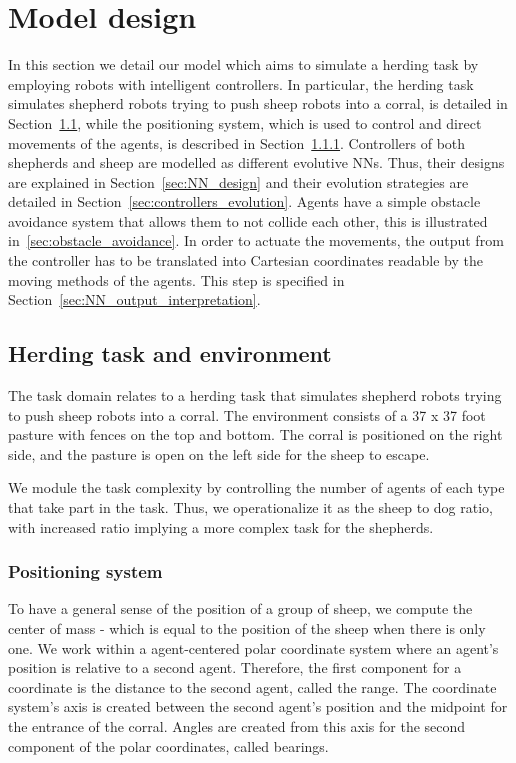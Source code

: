 \documentclass[conference]{IEEEtran}
\begin{document}
\section{Model design}
In this section we detail our model which aims to simulate a herding task by employing robots with intelligent controllers.
In particular, the herding task simulates shepherd robots trying to push sheep robots into a corral, is detailed in Section~\ref{sec:herding_task_environment},
while the positioning system, which is used to control and direct movements of the agents, is described in Section~\ref{sec:positioning_system}. 
Controllers of both shepherds and sheep are modelled as different evolutive NNs.
Thus, their designs are explained in Section~\ref{sec:NN_design} and their evolution strategies are detailed in Section~\ref{sec:controllers_evolution}.
Agents have a simple obstacle avoidance system that allows them to not collide each other, this is illustrated in~\ref{sec:obstacle_avoidance}.
In order to actuate the movements, the output from the controller has to be translated into Cartesian coordinates readable by the moving methods of the agents.    
This step is specified in Section~\ref{sec:NN_output_interpretation}.

\subsection{Herding task and environment}
\label{sec:herding_task_environment}
The task domain relates to a herding task that simulates shepherd robots trying to push sheep robots into a corral. The environment consists of a 37 x 37 foot pasture with fences on the top and bottom. The corral is positioned on the right side, and the pasture is open on the left side for the sheep to escape.

We module the task complexity by controlling the number of agents of each type that take part in the task. Thus, we operationalize it as the sheep to dog ratio, with increased ratio implying a more complex task for the shepherds.

\vspace{1em}
\subsubsection{Positioning system}
\label{sec:positioning_system}
To have a general sense of the position of a group of sheep, we compute the center of mass - which is equal to the position of the sheep when there is only one.
We work within a agent-centered polar coordinate system where an agent's position is relative to a second agent. 
Therefore, the first component for a coordinate is the distance to the second agent, called the range. 
The coordinate system's axis is created between the second agent's position and the midpoint for the entrance of the corral. 
Angles are created from this axis for the second component of the polar coordinates, called bearings. 
\end{document}
